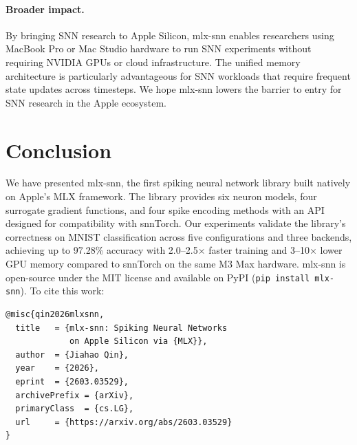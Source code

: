 \documentclass[11pt]{article}
\begin{document}
\paragraph{Broader impact.}
By bringing SNN research to Apple Silicon, mlx-snn enables researchers using MacBook Pro or Mac Studio hardware to run SNN experiments without requiring NVIDIA GPUs or cloud infrastructure. The unified memory architecture is particularly advantageous for SNN workloads that require frequent state updates across timesteps. We hope mlx-snn lowers the barrier to entry for SNN research in the Apple ecosystem.

\section{Conclusion}

We have presented mlx-snn, the first spiking neural network library built natively on Apple's MLX framework. The library provides six neuron models, four surrogate gradient functions, and four spike encoding methods with an API designed for compatibility with snnTorch. Our experiments validate the library's correctness on MNIST classification across five configurations and three backends, achieving up to 97.28\% accuracy with 2.0--2.5$\times$ faster training and 3--10$\times$ lower GPU memory compared to snnTorch on the same M3 Max hardware. mlx-snn is open-source under the MIT license and available on PyPI (\texttt{pip install mlx-snn}). To cite this work:

\begin{verbatim}
@misc{qin2026mlxsnn,
  title   = {mlx-snn: Spiking Neural Networks
             on Apple Silicon via {MLX}},
  author  = {Jiahao Qin},
  year    = {2026},
  eprint  = {2603.03529},
  archivePrefix = {arXiv},
  primaryClass  = {cs.LG},
  url     = {https://arxiv.org/abs/2603.03529}
}
\end{verbatim}



\end{document}
